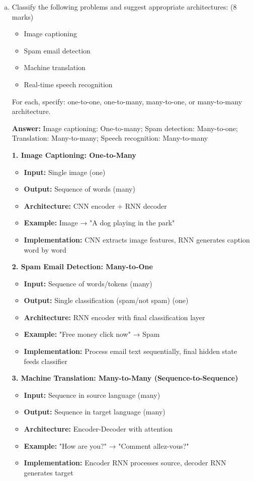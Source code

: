 \documentclass[12pt]{article}
\newcommand{\answer}[1]{{\color{answercolor}\textbf{Answer:} #1}}
\newcommand{\explanation}[1]{{\color{explanationcolor}#1}}
\begin{document}
\begin{enumerate}[(a)]
    \item Classify the following problems and suggest appropriate architectures: \hfill (8 marks)
    \begin{itemize}
        \item Image captioning
        \item Spam email detection
        \item Machine translation
        \item Real-time speech recognition
    \end{itemize}
    
    For each, specify: one-to-one, one-to-many, many-to-one, or many-to-many architecture.
    
    \answer{Image captioning: One-to-many; Spam detection: Many-to-one; Translation: Many-to-many; Speech recognition: Many-to-many}
    
    \explanation{
    \textbf{1. Image Captioning: One-to-Many}
    \begin{itemize}
        \item \textbf{Input:} Single image (one)
        \item \textbf{Output:} Sequence of words (many)
        \item \textbf{Architecture:} CNN encoder + RNN decoder
        \item \textbf{Example:} Image → "A dog playing in the park"
        \item \textbf{Implementation:} CNN extracts image features, RNN generates caption word by word
    \end{itemize}
    
    \textbf{2. Spam Email Detection: Many-to-One}
    \begin{itemize}
        \item \textbf{Input:} Sequence of words/tokens (many)
        \item \textbf{Output:} Single classification (spam/not spam) (one)
        \item \textbf{Architecture:} RNN encoder with final classification layer
        \item \textbf{Example:} "Free money click now" → Spam
        \item \textbf{Implementation:} Process email text sequentially, final hidden state feeds classifier
    \end{itemize}
    
    \textbf{3. Machine Translation: Many-to-Many (Sequence-to-Sequence)}
    \begin{itemize}
        \item \textbf{Input:} Sequence in source language (many)
        \item \textbf{Output:} Sequence in target language (many)
        \item \textbf{Architecture:} Encoder-Decoder with attention
        \item \textbf{Example:} "How are you?" → "Comment allez-vous?"
        \item \textbf{Implementation:} Encoder RNN processes source, decoder RNN generates target
    \end{itemize}
    
}
\end{enumerate}
\end{document}
